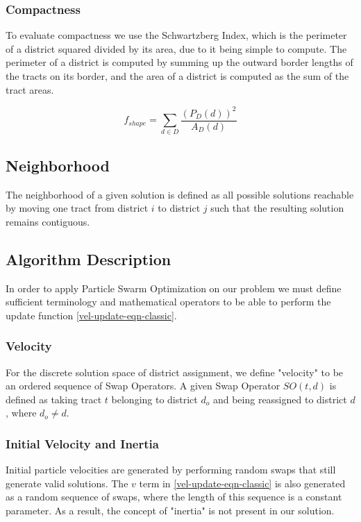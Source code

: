 \documentclass[journal]{IEEEtran}
\begin{document}
\subsubsection{Compactness}
To evaluate compactness we use the Schwartzberg Index\cite{schwartzberg}, which
is the perimeter of a district squared divided by its area, due to it being
simple to compute.  The perimeter of a district is computed by summing up the
outward border lengths of the tracts on its border, and the area of a district
is computed as the sum of the tract areas.

$$f_{shape} = \sum_{d \in D} \frac{(P_D(d))^2}{A_D(d)}$$

\subsection{Neighborhood}
The neighborhood of a given solution is defined as all possible solutions
reachable by moving one tract from district $i$ to district $j$ such that the
resulting solution remains contiguous.   


\subsection{Algorithm Description}
In order to apply Particle Swarm Optimization on our problem we must define
sufficient terminology and mathematical operators to be able to perform the
update function \ref{vel-update-eqn-classic}.\\

\subsubsection{Velocity}
For the discrete solution space of district assignment, we define "velocity" to
be an ordered sequence of Swap Operators.  A given Swap Operator $SO(t, d)$ is
defined as taking tract $t$ belonging to district $d_o$ and being reassigned to
district $d$, where $d_o \neq d$.\\

\subsubsection{Initial Velocity and Inertia}
Initial particle velocities are generated by performing random swaps that still
generate valid solutions.  The $v$ term in \ref{vel-update-eqn-classic} is also
generated as a random sequence of swaps, where the length of this sequence is a
constant parameter.  As a result, the concept of "inertia" is not present in our
solution.\\
\end{document}
